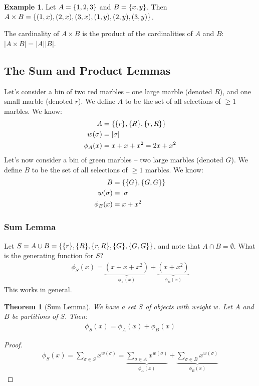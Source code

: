 \documentclass[]{article}
\newtheorem*{theorem}{Theorem}
\theoremstyle{definition}
\newtheorem{ex}{Example}[section]
\newcommand{\union}{\cup}
\newcommand{\intersection}{\cap}
\DeclarePairedDelimiter{\set}{\lbrace}{\rbrace}
\begin{document}
				\begin{ex}
					Let $A = \set{1, 2, 3}$ and $B = \set{x, y}$. Then $A \times B = \set{(1, x), (2, x), (3, x), (1, y), (2, y), (3, y) }$.
				\end{ex}

				The cardinality of $A \times B$ is the product of the cardinalities of $A$ and $B$: $|A \times B| = |A||B|$.
		\subsection{The Sum and Product Lemmas}
			Let's consider a bin of two red marbles -- one large marble (denoted $R$), and one small marble (denoted $r$). We define $A$ to be the set of all selections of $\ge 1$ marbles. We know:
			\begin{align*}
				A &= \set{\set{r}, \set{R}, \set{r, R} } \\
				w(\sigma) &= |\sigma| \\
				\phi_A(x) &= x + x + x^2 = 2x + x^2
			\end{align*}
			Let's now consider a bin of green marbles -- two large marbles (denoted $G$). We define $B$ to be the set of all selections of $\ge 1$ marbles. We know:
			\begin{align*}
				B &= \set{\set{G}, \set{G, G} } \\
				w(\sigma) &= |\sigma| \\
				\phi_B(x) &= x + x^2
			\end{align*}
			\subsubsection{Sum Lemma}
				Let $S = A \union B = \set{\set{r}, \set{R}, \set{r, R}, \set{G}, \set{G, G} }$, and note that $A \intersection B = \emptyset$. What is the generating function for $S$?
				\begin{align*}
					\phi_S(x) = \underbrace{(x + x + x^2)}_{\phi_A(x)} + \underbrace{(x  + x^2)}_{\phi_B(x)}
				\end{align*}
				This works in general.

				\begin{theorem}[Sum Lemma]
					We have a set $S$ of objects with weight $w$. Let $A$ and $B$ be partitions of $S$. Then:
					\begin{align*}
						\phi_S(x) = \phi_A(x) + \phi_B(x)
					\end{align*}
				\end{theorem}

				\begin{proof}
					\begin{align*}
						\phi_S(x) = \sum_{\sigma \in S} x^{w(\sigma)} = \underbrace{\sum_{\sigma \in A} x^{w(\sigma)}}_{\phi_A(x)} + \underbrace{\sum_{\sigma \in B} x^{w(\sigma)}}_{\phi_B(x)}
					\end{align*}
				\end{proof}
\end{document}
